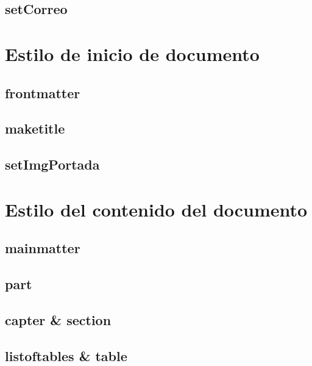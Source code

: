     \hypertarget{setCorreo}{}
    \subsection{setCorreo}

\section{Estilo de inicio de documento}
    
    \hypertarget{frontmatter}{}
    \subsection{frontmatter}
    
    \hypertarget{maketitle}{}
    \subsection{maketitle}
    
    \hypertarget{setImgPortada}{}
    \subsection{setImgPortada}

\section{Estilo del contenido del documento}

    \hypertarget{mainmatter}{}
    \subsection{mainmatter}   
    
    \hypertarget{part}{}
    \subsection{part}
    
    \hypertarget{chapter}{}
    \hypertarget{section}{}
    \subsection{capter \& section}
    
    \hypertarget{listoftables}{}
    \hypertarget{table}{}
    \subsection{listoftables \& table}
    
    
